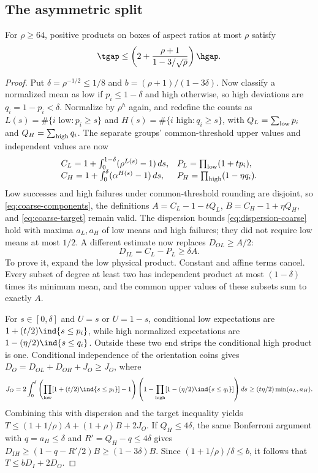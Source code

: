 \subsection{The asymmetric split}
\begin{proposition}\label{prop:asymmetric-box}
For $\rho\ge64$, positive products on boxes of aspect ratios at most
$\rho$ satisfy
\[
 \tgap\le\left(2+\frac{\rho+1}{1-3/\sqrt\rho}\right)\hgap.
\]
\end{proposition}
\begin{proof}
Put $\delta=\rho^{-1/2}\le1/8$ and $b=(\rho+1)/(1-3\delta)$.
Now classify a normalized mean as low if $p_i\le1-\delta$ and high
otherwise, so high deviations are $q_i=1-p_i<\delta$. Normalize by
$\rho^h$ again, and redefine the counts as
$L(s)=\#\{i\text{ low}:p_i\ge s\}$ and
$H(s)=\#\{i\text{ high}:q_i\ge s\}$, with
$Q_L=\sum_{\rm low}p_i$ and $Q_H=\sum_{\rm high}q_i$.
The separate groups' common-threshold upper values and independent
values are now
\[
 \begin{array}{ll}
 C_L=1+\int_0^{1-\delta}(\rho^{L(s)}-1)\,ds,
 &P_L=\prod_{\rm low}(1+tp_i),\\
 C_H=1+\int_0^\delta(\alpha^{H(s)}-1)\,ds,
 &P_H=\prod_{\rm high}(1-\eta q_i).
 \end{array}
\]
Low successes and high failures under common-threshold rounding are
disjoint, so \eqref{eq:coarse-components}, the definitions
$A=C_L-1-tQ_L$, $B=C_H-1+\eta Q_H$, and
\eqref{eq:coarse-target} remain valid. The dispersion bounds
\eqref{eq:dispersion-coarse} hold with maxima $a_L,a_H$ of low means
and high failures; they did not require low means at most $1/2$.
A different estimate now replaces $D_{OL}\ge A/2$:
\[
 D_{IL}=C_L-P_L\ge\delta A.
\]
To prove it, expand the low physical product. Constant and affine terms
cancel. Every subset of degree at least two has independent product at
most $(1-\delta)$ times its minimum mean, and the common upper values of
these subsets sum to exactly $A$.

For $s\in[0,\delta]$ and $U=s$ or $U=1-s$, conditional low expectations
are $1+(t/2)\ind\{s\le p_i\}$, while high normalized expectations
are $1-(\eta/2)\ind\{s\le q_i\}$. Outside these two end strips
the conditional high product is one. Conditional independence of the
orientation coins gives $D_O=D_{OL}+D_{OH}+J_O\ge J_O$, where
\[
 J_O=2\int_0^\delta
 \left(\prod_{\rm low}[1+(t/2)\ind\{s\le p_i\}]-1\right)
 \left(1-\prod_{\rm high}[1-(\eta/2)\ind\{s\le q_i\}]\right)ds
 \ge(t\eta/2)\min(a_L,a_H).
\]
Combining this with dispersion and the target inequality yields
$T\le(1+1/\rho)A+(1+\rho)B+2J_O$.
If $Q_H\le4\delta$, the same Bonferroni argument with $q=a_H\le\delta$
and $R'=Q_H-q\le4\delta$ gives
$D_{IH}\ge(1-q-R'/2)B\ge(1-3\delta)B$.
Since $(1+1/\rho)/\delta\le b$, it follows that
$T\le bD_I+2D_O$.


\end{proof}
